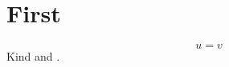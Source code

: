 \documentclass{article}
\begin{document}
\section{First}\label{sec:a}
\begin{equation}\label{eq:b} u = v \end{equation}
Kind  and .
\end{document}
